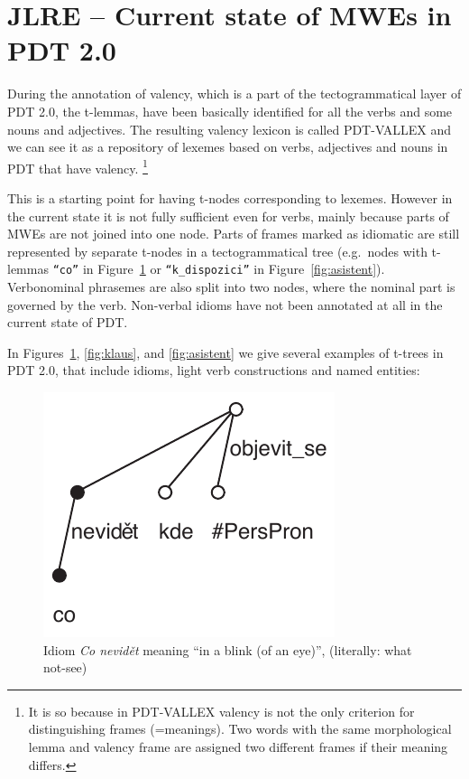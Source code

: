 \section{JLRE -- Current state of MWEs in PDT 2.0}
\label{sec:pdt:mwes}

During the annotation of valency, which is a part of the tectogrammatical layer of PDT 2.0, the t-lemmas, have been basically identified for all the verbs and some nouns and adjectives.
The resulting valency lexicon is called PDT-VALLEX \citep{hajic:2003} and we can see it as a repository of lexemes based on verbs, adjectives and nouns in PDT that have valency.
%
\footnote{It is so because in PDT-VALLEX valency is not the only criterion for distinguishing frames (=meanings). Two words with the same morphological lemma and valency frame are assigned two different frames if their meaning differs.} 

This is a starting point for having t-nodes corresponding to lexemes. However in the current state it is not fully sufficient even for verbs, mainly because parts of MWEs are not joined into one node. Parts of frames marked as idiomatic are still represented by separate t-nodes in a tectogrammatical tree (e.g.~nodes with t-lemmas {\tt“co”} in Figure~\ref{fig:co-nevidet} or {\tt“k\_dispozici”} in Figure~\ref{fig:asistent}). Verbonominal phrasemes are also split into two nodes, where the nominal part is governed by the verb. Non-verbal idioms have not been annotated at all in the current state of PDT. 

In Figures~\ref{fig:co-nevidet}, \ref{fig:klaus}, and \ref{fig:asistent} we give several examples of t-trees in PDT 2.0, that include idioms, light verb constructions and named entities:
\begin{figure}[htbp]
   \centerline{\includegraphics[scale=.7]{images/co-nevidet-clause.pdf}}
   \caption{\label{fig:co-nevidet}Idiom \emph{Co nevidět} meaning ``in a blink (of an eye)'', (literally: what not-see)}
\end{figure}

